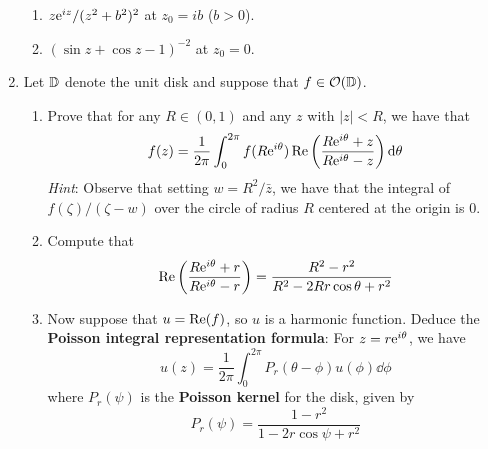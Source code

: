 \documentclass[../psets.tex]{subfiles}
\begin{document}
\begin{enumerate}[ref={A.\arabic*}]
\begin{enumerate}
        \item $z\e[iz]/(z^2+b^2)^2$ at $z_0=ib$ ($b>0$).
        \item $(\sin z+\cos z-1)^{-2}$ at $z_0=0$.
    \end{enumerate}
    \item Let $\D$ denote the unit disk and suppose that $f\in\mO(\D)$.
    \begin{enumerate}
        \item Prove that for any $R\in(0,1)$ and any $z$ with $|z|<R$, we have that
        \begin{equation*}
            f(z) = \frac{1}{2\pi}\int_0^{2\pi}f(R\e[i\theta])\re\left( \frac{R\e[i\theta]+z}{R\e[i\theta]-z} \right)\dd\theta
        \end{equation*}
        \emph{Hint}: Observe that setting $w=R^2/\bar{z}$, we have that the integral of $f(\zeta)/(\zeta-w)$ over the circle of radius $R$ centered at the origin is 0.
        \item Compute that
        \begin{equation*}
            \re\left( \frac{R\e[i\theta]+r}{R\e[i\theta]-r} \right) = \frac{R^2-r^2}{R^2-2Rr\cos\theta+r^2}
        \end{equation*}
        \item Now suppose that $u=\re(f)$, so $u$ is a harmonic function. Deduce the \textbf{Poisson integral representation formula}: For $z=r\e[i\theta]$, we have
        \begin{equation*}
            u(z) = \frac{1}{2\pi}\int_0^{2\pi}P_r(\theta-\phi)u(\phi)\dd\phi
        \end{equation*}
        where $P_r(\psi)$ is the \textbf{Poisson kernel} for the disk, given by
        \begin{equation*}
            P_r(\psi) = \frac{1-r^2}{1-2r\cos\psi+r^2}
        \end{equation*}
    \end{enumerate}
\end{enumerate}
\end{document}
